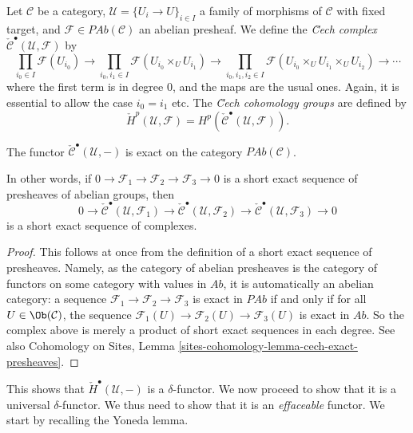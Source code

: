 \begin{definition}
\label{definition-cech-complex}
Let $\mathcal{C}$ be a category,
$\mathcal{U} = \{U_i \to U\}_{i \in I}$ a family of morphisms of $\mathcal{C}$
with fixed target, and $\mathcal{F} \in \textit{PAb}(\mathcal{C})$ an abelian
presheaf. We define the {\it \u Cech complex}
$\check{\mathcal{C}}^\bullet(\mathcal{U}, \mathcal{F})$ by
$$
\prod_{i_0\in I} \mathcal{F}(U_{i_0}) \to
\prod_{i_0, i_1\in I} \mathcal{F}(U_{i_0} \times_U U_{i_1}) \to
\prod_{i_0, i_1, i_2 \in I}
\mathcal{F}(U_{i_0} \times_U U_{i_1} \times_U U_{i_2}) \to \cdots
$$
where the first term is in degree 0, and the maps are the usual ones. Again, it
is essential to allow the case $i_0 = i_1$ etc. The
{\it \u Cech cohomology groups} are defined by
$$
\check{H}^p(\mathcal{U}, \mathcal{F}) =
H^p(\check{\mathcal{C}}^\bullet(\mathcal{U}, \mathcal{F})).
$$
\end{definition}

\begin{lemma}
\label{lemma-cech-presheaves}
The functor $\check{\mathcal{C}}^\bullet(\mathcal{U}, -)$
is exact on the category $\textit{PAb}(\mathcal{C})$.
\end{lemma}	

\noindent
In other words, if $0\to \mathcal{F}_1\to \mathcal{F}_2\to \mathcal{F}_3\to 0$
is a short exact sequence of presheaves of abelian groups, then
$$
0 \to \check{\mathcal{C}}^\bullet\left(\mathcal{U}, \mathcal{F}_1\right)
\to\check{\mathcal{C}}^\bullet(\mathcal{U}, \mathcal{F}_2) \to
\check{\mathcal{C}}^\bullet(\mathcal{U}, \mathcal{F}_3)\to 0
$$
is a short exact sequence of complexes.

\begin{proof}
This follows at once from the definition of a short exact sequence of
presheaves. Namely, as the category of abelian presheaves is the category of
functors on some category with values in $\textit{Ab}$, it is automatically an
abelian category: a sequence $\mathcal{F}_1\to \mathcal{F}_2\to \mathcal{F}_3$
is exact in $\textit{PAb}$ if and only if for all
$U \in \Ob(\mathcal{C})$, the sequence
$\mathcal{F}_1(U) \to \mathcal{F}_2(U) \to \mathcal{F}_3(U)$ is exact in
$\textit{Ab}$. So the complex above is merely a product of short exact
sequences in each degree. See also
Cohomology on Sites, Lemma \ref{sites-cohomology-lemma-cech-exact-presheaves}.
\end{proof}

\noindent
This shows that $\check{H}^\bullet(\mathcal{U}, -)$ is a $\delta$-functor.
We now proceed to show that it is a universal $\delta$-functor. We thus need to
show that it is an {\it effaceable} functor. We start by recalling the Yoneda
lemma.

